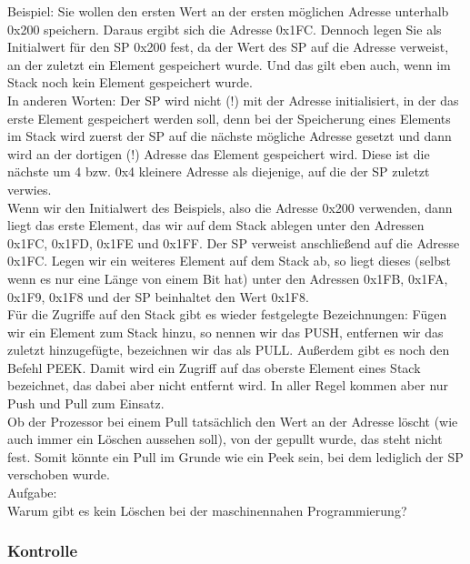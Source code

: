 Beispiel: Sie wollen den ersten Wert an der ersten möglichen Adresse unterhalb 0x200 speichern. Daraus ergibt sich die Adresse 0x1FC. Dennoch legen Sie als Initialwert für den SP 0x200 fest, da der Wert des SP auf die Adresse verweist, an der zuletzt ein Element gespeichert wurde. Und das gilt eben auch, wenn im Stack noch kein Element gespeichert wurde. \\

In anderen Worten: Der SP wird nicht (!) mit der Adresse initialisiert, in der das erste Element gespeichert werden soll, denn bei der Speicherung eines Elements im Stack wird zuerst der SP auf die nächste mögliche Adresse gesetzt und dann wird an der dortigen (!) Adresse das Element gespeichert wird. Diese ist die nächste um 4 bzw. 0x4 kleinere Adresse als diejenige, auf die der SP zuletzt verwies.\\

Wenn wir den Initialwert des Beispiels, also die Adresse 0x200 verwenden, dann liegt das erste Element, das wir auf dem Stack ablegen unter den Adressen 0x1FC, 0x1FD, 0x1FE und 0x1FF. Der SP verweist anschließend auf die Adresse 0x1FC. Legen wir ein weiteres Element auf dem Stack ab, so liegt dieses (selbst wenn es nur eine Länge von einem Bit hat) unter den Adressen 0x1FB, 0x1FA, 0x1F9, 0x1F8 und der SP beinhaltet den Wert 0x1F8.\\

Für die Zugriffe auf den Stack gibt es wieder festgelegte Bezeichnungen: Fügen wir ein Element zum Stack hinzu, so nennen wir das PUSH, entfernen wir das zuletzt hinzugefügte, bezeichnen wir das als PULL. Außerdem gibt es noch den Befehl PEEK. Damit wird ein Zugriff auf das oberste Element eines Stack bezeichnet, das dabei aber nicht entfernt wird. In aller Regel kommen aber nur Push und Pull zum Einsatz.\\

Ob der Prozessor bei einem Pull tatsächlich den Wert an der Adresse löscht (wie auch immer ein Löschen aussehen soll), von der gepullt wurde, das steht nicht fest. Somit könnte ein Pull im Grunde wie ein Peek sein, bei dem lediglich der SP verschoben wurde.\\

Aufgabe:\\

Warum gibt es kein Löschen bei der maschinennahen Programmierung?\\

\subsubsection{Kontrolle}

